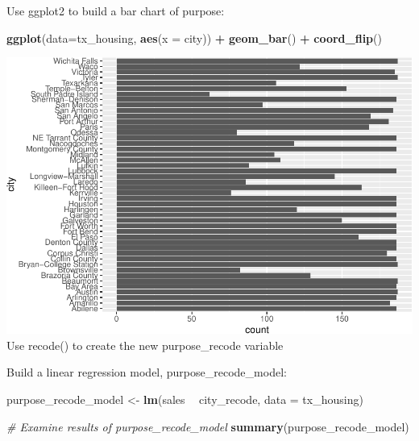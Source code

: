 \documentclass[]{book}
\newenvironment{Shaded}{\begin{snugshade}}{\end{snugshade}}
\newcommand{\CommentTok}[1]{\textcolor[rgb]{0.56,0.35,0.01}{\textit{#1}}}
\newcommand{\DataTypeTok}[1]{\textcolor[rgb]{0.13,0.29,0.53}{#1}}
\newcommand{\KeywordTok}[1]{\textcolor[rgb]{0.13,0.29,0.53}{\textbf{#1}}}
\newcommand{\NormalTok}[1]{#1}
\newcommand{\OperatorTok}[1]{\textcolor[rgb]{0.81,0.36,0.00}{\textbf{#1}}}
\newcommand{\StringTok}[1]{\textcolor[rgb]{0.31,0.60,0.02}{#1}}
\begin{document}
Use ggplot2 to build a bar chart of purpose:

\begin{Shaded}
\begin{Highlighting}[]
\KeywordTok{ggplot}\NormalTok{(}\DataTypeTok{data=}\NormalTok{tx_housing, }\KeywordTok{aes}\NormalTok{(}\DataTypeTok{x =}\NormalTok{ city)) }\OperatorTok{+}\StringTok{ }
\StringTok{  }\KeywordTok{geom_bar}\NormalTok{() }\OperatorTok{+}
\StringTok{  }\KeywordTok{coord_flip}\NormalTok{()}
\end{Highlighting}
\end{Shaded}

\includegraphics{code4stem_files/figure-latex/visualize txhousing-1.pdf}
Use recode() to create the new purpose\_recode variable

\begin{Shaded}
\end{Shaded}

Build a linear regression model, purpose\_recode\_model:

\begin{Shaded}
\begin{Highlighting}[]
\NormalTok{purpose_recode_model <-}\StringTok{ }\KeywordTok{lm}\NormalTok{(sales }\OperatorTok{~}\StringTok{ }\NormalTok{city_recode, }\DataTypeTok{data =}\NormalTok{ tx_housing)}

\CommentTok{# Examine results of purpose_recode_model}
\KeywordTok{summary}\NormalTok{(purpose_recode_model)}
\end{Highlighting}
\end{Shaded}
\end{document}
